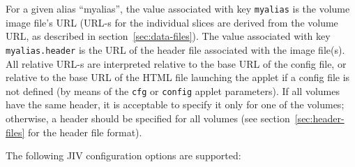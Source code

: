 For a given alias ``myalias'', the value associated with key
\verb+myalias+ is the volume image file's URL (URL-s for the
individual slices are derived from the volume URL, as described in
section~\ref{sec:data-files}). The value associated with key
\verb+myalias.header+ is the URL of the header file associated with
the image file(s). All relative URL-s are interpreted relative to the
base URL of the config file, or relative to the base URL of the HTML
file launching the applet if a config file is not defined (by means of
the \verb+cfg+ or \verb+config+ applet parameters).  If all volumes
have the same header, it is acceptable to specify it only for one of
the volumes; otherwise, a header should be specified for all volumes
(see section~\ref{sec:header-files} for the header file format).

The following JIV configuration options are supported:
